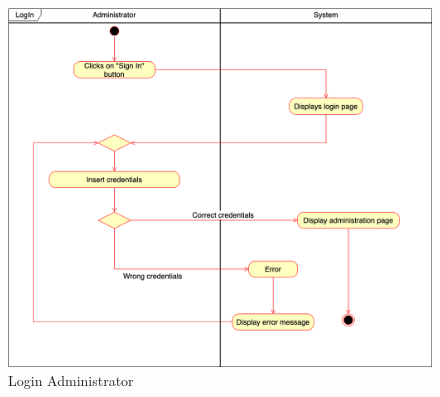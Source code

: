     \begin{figure}[h!]
        \centering
        \includegraphics[scale=0.35]{images/use_cases_diagram/administrator_login.png}
        \caption{Login Administrator}
        \label{fig:administrator_login}
    \end{figure}
 \FloatBarrier   
 
 \newpage
 
